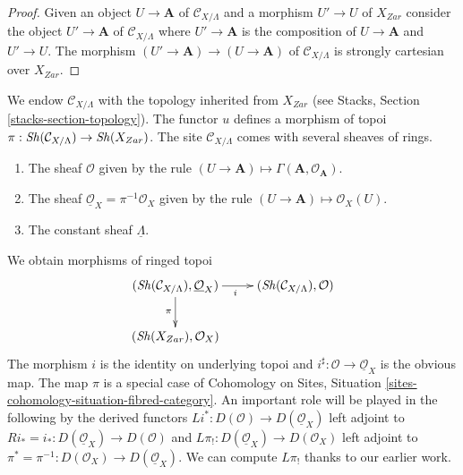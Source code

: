 \begin{proof}
Given an object $U \to \mathbf{A}$ of $\mathcal{C}_{X/\Lambda}$ and a morphism
$U' \to U$ of $X_{Zar}$ consider the object $U' \to \mathbf{A}$ of
$\mathcal{C}_{X/\Lambda}$ where $U' \to \mathbf{A}$ is the composition of
$U \to \mathbf{A}$ and $U' \to U$. The morphism
$(U' \to \mathbf{A}) \to (U \to \mathbf{A})$ of
$\mathcal{C}_{X/\Lambda}$ is strongly cartesian over $X_{Zar}$.
\end{proof}

\noindent
We endow $\mathcal{C}_{X/\Lambda}$ with the topology inherited from
$X_{Zar}$ (see Stacks, Section \ref{stacks-section-topology}).
The functor $u$ defines a morphism of topoi
$\pi : \mathop{\mathit{Sh}}\nolimits(\mathcal{C}_{X/\Lambda}) \to \mathop{\mathit{Sh}}\nolimits(X_{Zar})$.
The site $\mathcal{C}_{X/\Lambda}$ comes with several sheaves of rings.
\begin{enumerate}
\item The sheaf $\mathcal{O}$ given by the rule
$(U \to \mathbf{A}) \mapsto \Gamma(\mathbf{A}, \mathcal{O}_\mathbf{A})$.
\item The sheaf $\underline{\mathcal{O}}_X = \pi^{-1}\mathcal{O}_X$ given by
the rule $(U \to \mathbf{A}) \mapsto \mathcal{O}_X(U)$.
\item The constant sheaf $\underline{\Lambda}$.
\end{enumerate}
We obtain morphisms of ringed topoi
\begin{equation}
\label{equation-pi-schemes}
\vcenter{
\xymatrix{
(\Sh(\mathcal{C}_{X/\Lambda}), \underline{\mathcal{O}}_X) \ar[r]_i \ar[d]_\pi &
(\Sh(\mathcal{C}_{X/\Lambda}), \mathcal{O}) \\
(\Sh(X_{Zar}), \mathcal{O}_X)
}
}
\end{equation}
The morphism $i$ is the identity on underlying topoi and
$i^\sharp : \mathcal{O} \to \underline{\mathcal{O}}_X$
is the obvious map.
The map $\pi$ is a special case of Cohomology on Sites, Situation
\ref{sites-cohomology-situation-fibred-category}.
An important role will be played in the following
by the derived functors
$
Li^* : D(\mathcal{O}) \longrightarrow D(\underline{\mathcal{O}}_X)
$
left adjoint to $Ri_* = i_* : D(\underline{\mathcal{O}}_X) \to D(\mathcal{O})$
and
$
L\pi_! : D(\underline{\mathcal{O}}_X) \longrightarrow D(\mathcal{O}_X)
$
left adjoint to
$\pi^* = \pi^{-1} : D(\mathcal{O}_X) \to D(\underline{\mathcal{O}}_X)$.
We can compute $L\pi_!$ thanks to our earlier work.

